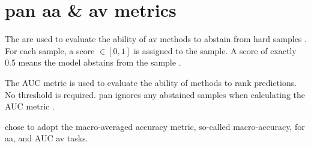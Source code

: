 \section{\ac{pan} \ac{aa} \& \ac{av} metrics}
\label{sec:pan_aa_av_metrics}

The  are used to evaluate the ability of \ac{av} methods 
to abstain from hard samples \citep{tyo_state_2022}.
For each sample, a score $\in [0, 1]$ is assigned to the sample.
A score of exactly 0.5 means the model abstains from the sample \citep{tyo_state_2022,bevendorff_overview_2024,kocher_unine_2015}.

The AUC metric is used to evaluate the ability of methods to rank predictions.
No threshold is required.
\ac{pan} ignores any abstained samples when calculating the AUC metric \citep{tyo_state_2022}.

\citet{tyo_state_2022} chose to adopt the macro-averaged accuracy metric, so-called macro-accuracy, for \ac{aa}, 
and AUC \ac{av} tasks.